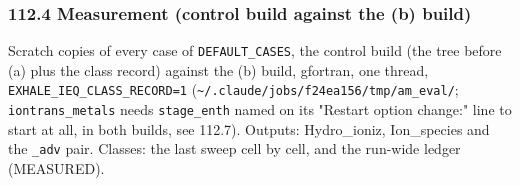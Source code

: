 \documentclass[english,a4paper]{my_memo}
\begin{document}
\subsubsection{112.4 Measurement (control build against the (b) build)}\label{1124-measurement-control-build-against-the-b-build}

Scratch copies of every case of \texttt{DEFAULT\_CASES}, the control build (the tree
before (a) plus the class record) against the (b) build, gfortran, one
thread, \texttt{EXHALE\_IEQ\_CLASS\_RECORD=1} (\texttt{\textasciitilde{}/.claude/jobs/f24ea156/tmp/am\_eval/};
\texttt{iontrans\_metals} needs \texttt{stage\_enth} named on its "Restart option change:"
line to start at all, in both builds, see 112.7). Outputs: Hydro\_ioniz,
Ion\_species and the \texttt{\_adv} pair. Classes: the last sweep cell by cell, and
the run-wide ledger (MEASURED).
\end{document}

